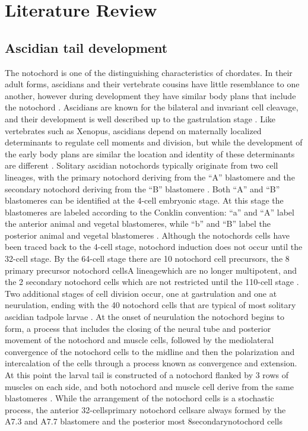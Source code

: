 \chapter{Literature Review}
\section{Ascidian tail development}

The notochord is one of the distinguishing characteristics of chordates. In their adult forms, ascidians and their vertebrate cousins have little resemblance to one another, however during development they have similar body plans that include the notochord \cite{jeffery_minireview_2002}. Ascidians are known for the bilateral and invariant cell cleavage, and their development is well described up to the gastrulation stage \cite{nishida_cell_1983,nishida_cell_1985,nishida_cell_1987}. Like vertebrates such as Xenopus, ascidians depend on maternally localized determinants to regulate cell moments and division, but while the development of the early body plans are similar the location and identity of these determinants are different \cite{lemaire_ascidians_2008}. Solitary ascidian notochords typically originate from two cell lineages, with the primary notochord deriving from the ``A'' blastomere and the secondary notochord deriving from the ``B'' blastomere \cite{nishida_cell_1983}.  Both ``A'' and ``B'' blastomeres can be identified at the 4-cell embryonic stage. At this stage the blastomeres are labeled according to the Conklin convention: ``a'' and ``A'' label the anterior animal and vegetal blastomeres, while ``b'' and ``B'' label the posterior animal and vegetal blastomeres \cite{conklin_organization_1905} . Although the notochords cells have been traced back to the 4-cell stage, notochord induction does not occur until the 32-cell stage. By the 64-cell stage there are 10 notochord cell precursors, the 8 primary precursor notochord cells\textemdash A lineage\textemdash which are no longer multipotent, and the 2 secondary notochord cells which are not restricted until the 110-cell stage \cite{nishida_cell_1985,yasuo_ascidian_1994,yasuo_conservation_1998,lemaire_unfolding_2009}. Two additional stages of cell division occur, one at gastrulation and one at neurulation, ending with the 40 notochord cells that are typical of most solitary ascidian tadpole larvae \cite{conklin_organization_1905}. At the onset of neurulation the notochord begins to form, a process that includes the closing of the neural tube and posterior movement of the notochord and muscle cells, followed by the mediolateral convergence of the notochord cells to the midline and then the polarization and intercalation of the cells through a process known as convergence and extension\cite{swalla_mechanisms_1993}. At this point the larval tail is constructed of a notochord flanked by 3 rows of muscles on each side, and both notochord and muscle cell derive from the same blastomeres \cite{nishida_cell_1985}. While the arrangement of the notochord cells is a stochastic process, the anterior 32-cells\textemdash primary notochord cells\textemdash are always formed by the A7.3 and A7.7 blastomere and the posterior most 8\textemdash secondary\textemdash notochord cells 